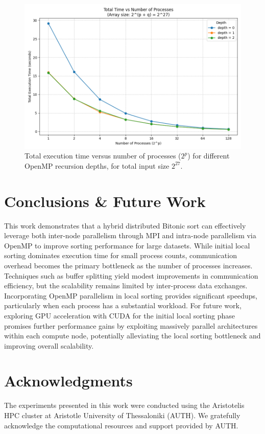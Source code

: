 \documentclass{article}
\begin{document}
\begin{figure}[h]
    \centering
    \includegraphics[width=1\linewidth]{figures/total_time_vs_procs_by_depth.png}
    \caption{Total execution time versus number of processes ($2^p$) for different OpenMP recursion depths, 
    for total input size $2^{27}$.}
    \label{fig:total_time_vs_procs_by_depth}
\end{figure}


\section*{Conclusions \& Future Work}

This work demonstrates that a hybrid distributed Bitonic sort can effectively leverage both inter-node 
parallelism through MPI and intra-node parallelism via OpenMP to improve sorting performance for large datasets. 
While initial local sorting dominates execution time for small process counts, communication overhead becomes the 
primary bottleneck as the number of processes increases. Techniques such as buffer splitting yield modest 
improvements in communication efficiency, but the scalability remains limited by inter-process data exchanges. 
Incorporating OpenMP parallelism in local sorting provides significant speedups, particularly when each process 
has a substantial workload. For future work, exploring GPU acceleration with CUDA for the initial local sorting 
phase promises further performance gains by exploiting massively parallel architectures within each compute node, 
potentially alleviating the local sorting bottleneck and improving overall scalability.


\section*{Acknowledgments}

The experiments presented in this work were conducted using the Aristotelis HPC cluster at Aristotle 
University of Thessaloniki (AUTH). We gratefully acknowledge the computational resources and support 
provided by AUTH.
\end{document}
